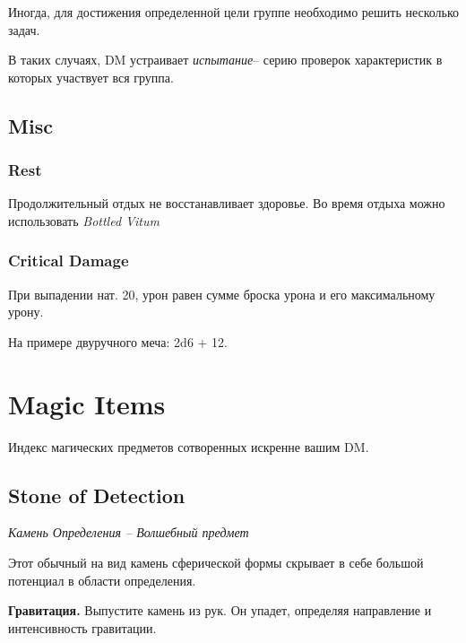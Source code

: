 \documentclass[a4paper,11pt]{book}
\newcommand{\ii}[1]
    {{\AlegreyaSansOsF
      \itshape
      #1}}{}
\newenvironment{Frame}{%
        \begin{tcolorbox}[%
            drop lifted shadow,
            notitle, sharp corners, colback=white!98!black,
            frame hidden,
            borderline west = {0.1pt}{0pt}{gray!10!bordercolor},
            borderline east = {0.1pt}{0pt}{gray!10!bordercolor},
            borderline north = {1pt}{0pt}{bordercolor},
            borderline south = {1pt}{0pt}{bordercolor},
            boxrule=0.5pt, boxsep=0pt, enhanced,
            fuzzy shadow={0pt}{0pt}{-0.5pt}{0.8pt}{opacity=0.005,white!30!gray}
        ]%
    }{%
        \end{tcolorbox}
    }
\newenvironment{Item}[2]
    {
     \smallskip
     \begin{Frame}
     \section{#1}
     \ii{#2}
     \smallskip \\
     \setlength{\parindent}{1.5em}
    }{
        \smallskip
        \end{Frame}
    }
\begin{document}
\begin{multicols}{2}
Иногда, для достижения определенной цели группе необходимо решить несколько задач.

В таких случаях, DM устраивает \ii{испытание}-- серию проверок характеристик в которых участвует вся группа.

%
%
%

\section{Misc}

\subsection{Rest}
Продолжительный отдых не восстанавливает здоровье. Во время отдыха можно использовать \textit{Bottled Vitum}

\subsection{Critical Damage}
При выпадении нат. 20, урон равен сумме броска урона и его максимальному урону.

На примере двуручного меча: 2d6 + 12.


\chapter{Magic Items}
Индекс магических предметов сотворенных искренне вашим DM.

\begin{Item}{Stone of Detection}{Камень Определения -- Волшебный предмет}
    Этот обычный на вид камень сферической формы скрывает в себе большой потенциал в области определения.

    \textbf{Гравитация.} Выпустите камень из рук. Он упадет, определяя направление и интенсивность гравитации.


\end{Item}
\end{multicols}
\end{document}
